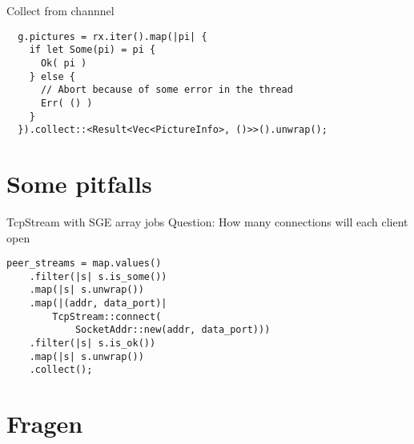 \documentclass[aspectratio=1610,t]{beamer}
\begin{document}
\begin{frame}[fragile]{Collect from channnel}
\begin{verbatim}
  g.pictures = rx.iter().map(|pi| {
    if let Some(pi) = pi {
      Ok( pi )
    } else {
      // Abort because of some error in the thread
      Err( () )
    }
  }).collect::<Result<Vec<PictureInfo>, ()>>().unwrap();
\end{verbatim}
\end{frame}

{
\section{Some pitfalls}
}
\begin{frame}[fragile]{TcpStream with SGE array jobs}
Question: How many connections will each client open
\begin{verbatim}
peer_streams = map.values()
    .filter(|s| s.is_some())
    .map(|s| s.unwrap())
    .map(|(addr, data_port)|
        TcpStream::connect(
            SocketAddr::new(addr, data_port)))
    .filter(|s| s.is_ok())
    .map(|s| s.unwrap())
    .collect();
\end{verbatim}
\end{frame}

{
\section{Fragen}
}




%
%
%
\end{document}
